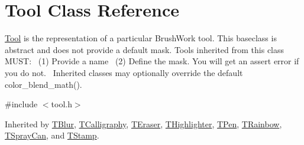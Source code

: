 \hypertarget{classTool}{}\section{Tool Class Reference}
\label{classTool}


\hyperlink{classTool}{Tool} is the representation of a particular Brush\+Work tool. This baseclass is abstract and does not provide a default mask. Tools inherited from this class M\+U\+ST\+:~\newline
(1) Provide a name~\newline
(2) Define the mask. You will get an assert error if you do not.~\newline
Inherited classes may optionally override the default color\+\_\+blend\+\_\+math().  




{\ttfamily \#include $<$tool.\+h$>$}



Inherited by \hyperlink{classTBlur}{T\+Blur}, \hyperlink{classTCalligraphy}{T\+Calligraphy}, \hyperlink{classTEraser}{T\+Eraser}, \hyperlink{classTHighlighter}{T\+Highlighter}, \hyperlink{classTPen}{T\+Pen}, \hyperlink{classTRainbow}{T\+Rainbow}, \hyperlink{classTSprayCan}{T\+Spray\+Can}, and \hyperlink{classTStamp}{T\+Stamp}.

